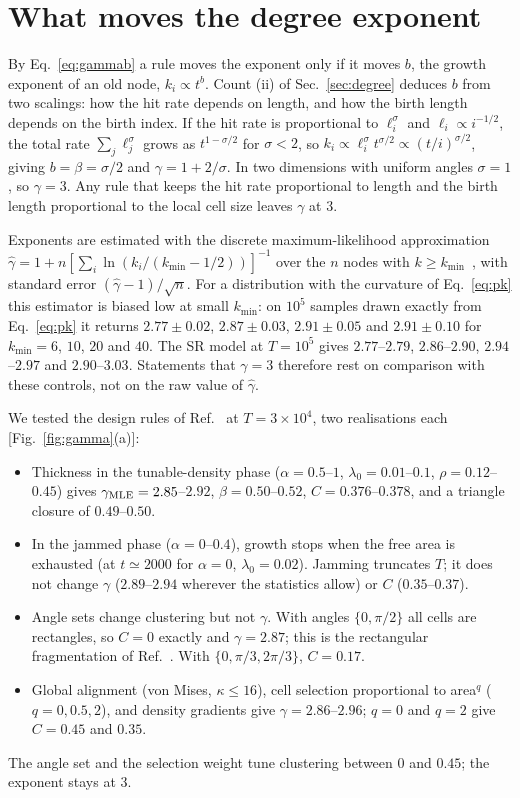\documentclass[pre,twocolumn,superscriptaddress,amsmath,amssymb,floatfix]{revtex4-2}
\begin{document}
\section{What moves the degree exponent}
\label{sec:gamma}

By Eq.~\eqref{eq:gammab} a rule moves the exponent only if it moves $b$, the growth
exponent of an old node, $k_i\propto t^b$. Count (ii) of Sec.~\ref{sec:degree}
deduces $b$ from two scalings: how the hit rate depends on length, and how the birth
length depends on the birth index. If the hit rate is proportional to $\ell_i^\sigma$
and $\ell_i\propto i^{-1/2}$, the total rate $\sum_j\ell_j^\sigma$ grows as
$t^{1-\sigma/2}$ for $\sigma<2$, so $k_i\propto\ell_i^\sigma t^{\sigma/2}\propto(t/i)^{\sigma/2}$,
giving $b=\beta=\sigma/2$ and $\gamma=1+2/\sigma$. In two dimensions with uniform angles
$\sigma=1$, so $\gamma=3$. Any rule that keeps the hit rate proportional to length and
the birth length proportional to the local cell size leaves $\gamma$ at $3$.

Exponents are estimated with the discrete maximum-likelihood approximation
$\hat\gamma=1+n[\sum_i\ln(k_i/(k_{\min}-1/2))]^{-1}$ over the $n$ nodes with
$k\ge k_{\min}$~\cite{clauset2009}, with standard error $(\hat\gamma-1)/\sqrt n$. For a
distribution with the curvature of Eq.~\eqref{eq:pk} this estimator is biased low at
small $k_{\min}$: on $10^5$ samples drawn exactly from Eq.~\eqref{eq:pk} it returns
$2.77\pm0.02$, $2.87\pm0.03$, $2.91\pm0.05$ and $2.91\pm0.10$ for $k_{\min}=6$, $10$, $20$
and $40$. The SR model at $T=10^5$ gives $2.77$--$2.79$, $2.86$--$2.90$, $2.94$--$2.97$
and $2.90$--$3.03$. Statements that $\gamma=3$ therefore rest on comparison with these
controls, not on the raw value of $\hat\gamma$.

We tested the design rules of Ref.~\cite{both2026} at $T=3\times10^4$, two
realisations each [Fig.~\ref{fig:gamma}(a)]:
\begin{itemize}
\item Thickness in the tunable-density phase ($\alpha=0.5$--$1$, $\lambda_0=0.01$--$0.1$,
$\rho=0.12$--$0.45$) gives $\gamma_{\rm MLE}=2.85$--$2.92$, $\beta=0.50$--$0.52$,
$C=0.376$--$0.378$, and a triangle closure of $0.49$--$0.50$.
\item In the jammed phase ($\alpha=0$--$0.4$), growth stops when the free area is
exhausted (at $t\simeq2000$ for $\alpha=0$, $\lambda_0=0.02$). Jamming truncates $T$; it
does not change $\gamma$ ($2.89$--$2.94$ wherever the statistics allow) or $C$
($0.35$--$0.37$).
\item Angle sets change clustering but not $\gamma$. With angles $\{0,\pi/2\}$ all cells are
rectangles, so $C=0$ exactly and $\gamma=2.87$; this is the rectangular fragmentation of
Ref.~\cite{krapivsky1994}. With $\{0,\pi/3,2\pi/3\}$, $C=0.17$.
\item Global alignment (von Mises, $\kappa\le16$), cell selection proportional to
area$^q$ ($q=0,0.5,2$), and density gradients give $\gamma=2.86$--$2.96$; $q=0$ and $q=2$
give $C=0.45$ and $0.35$.
\end{itemize}
The angle set and the selection weight tune clustering between $0$ and $0.45$; the
exponent stays at $3$.
\end{document}
